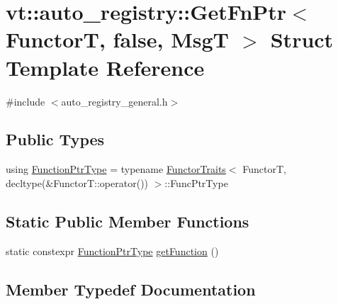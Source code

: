 \hypertarget{structvt_1_1auto__registry_1_1_get_fn_ptr_3_01_functor_t_00_01false_00_01_msg_t_01_4}{}\section{vt\+:\+:auto\+\_\+registry\+:\+:Get\+Fn\+Ptr$<$ FunctorT, false, MsgT $>$ Struct Template Reference}
\label{structvt_1_1auto__registry_1_1_get_fn_ptr_3_01_functor_t_00_01false_00_01_msg_t_01_4}


{\ttfamily \#include $<$auto\+\_\+registry\+\_\+general.\+h$>$}

\subsection*{Public Types}
\begin{DoxyCompactItemize}
\item 
using \hyperlink{structvt_1_1auto__registry_1_1_get_fn_ptr_3_01_functor_t_00_01false_00_01_msg_t_01_4_ae7611c944f926e6b7a882629dbda4efb}{Function\+Ptr\+Type} = typename \hyperlink{structvt_1_1_functor_traits}{Functor\+Traits}$<$ FunctorT, decltype(\&Functor\+T\+::operator()) $>$\+::Func\+Ptr\+Type
\end{DoxyCompactItemize}
\subsection*{Static Public Member Functions}
\begin{DoxyCompactItemize}
\item 
static constexpr \hyperlink{structvt_1_1auto__registry_1_1_get_fn_ptr_3_01_functor_t_00_01false_00_01_msg_t_01_4_ae7611c944f926e6b7a882629dbda4efb}{Function\+Ptr\+Type} \hyperlink{structvt_1_1auto__registry_1_1_get_fn_ptr_3_01_functor_t_00_01false_00_01_msg_t_01_4_a10f8dab2cc954636dcb4fa81ba70264d}{get\+Function} ()
\end{DoxyCompactItemize}


\subsection{Member Typedef Documentation}
\mbox{\label{structvt_1_1auto__registry_1_1_get_fn_ptr_3_01_functor_t_00_01false_00_01_msg_t_01_4_ae7611c944f926e6b7a882629dbda4efb}} 

